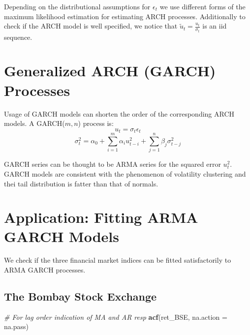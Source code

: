 \documentclass[11pt,]{article}
\newenvironment{Shaded}{\begin{snugshade}}{\end{snugshade}}
\newcommand{\KeywordTok}[1]{\textcolor[rgb]{0.13,0.29,0.53}{\textbf{#1}}}
\newcommand{\DataTypeTok}[1]{\textcolor[rgb]{0.13,0.29,0.53}{#1}}
\newcommand{\CommentTok}[1]{\textcolor[rgb]{0.56,0.35,0.01}{\textit{#1}}}
\newcommand{\NormalTok}[1]{#1}
\begin{document}
Depending on the distributional assumptions for \(\epsilon_t\) we use
different forms of the maximum likelihood estimation for estimating ARCH
processes. Additionally to check if the ARCH model is well specified, we
notice that \(\tilde{u}_t = \frac{u_t}{\sigma_t}\) is an iid sequence.

\section{Generalized ARCH (GARCH)
Processes}\label{generalized-arch-garch-processes}

Usage of GARCH models can shorten the order of the corresponding ARCH
models. A GARCH(\(m,n\)) process is: \[u_t = \sigma_t \epsilon_t\]
\[\sigma_t^2 = \alpha_0 + \sum_{i=1}^m \alpha_iu_{t-i}^2 + \sum_{j=1}^n \beta_j\sigma_{t-j}^2\]

GARCH series can be thought to be ARMA series for the squared error
\(u_t^2\). GARCH models are consistent with the phenomenon of volatility
clustering and thei tail distribution is fatter than that of normals.

\section{Application: Fitting ARMA GARCH
Models}\label{application-fitting-arma-garch-models}

We check if the three financial market indices can be fitted
satisfactorily to ARMA GARCH processes.

\subsection{The Bombay Stock Exchange}\label{the-bombay-stock-exchange}

\begin{Shaded}
\begin{Highlighting}[]
\CommentTok{# For lag order indication of MA and AR resp}
\KeywordTok{acf}\NormalTok{(ret_BSE, }\DataTypeTok{na.action =}\NormalTok{ na.pass)}
\end{Highlighting}
\end{Shaded}
\end{document}
